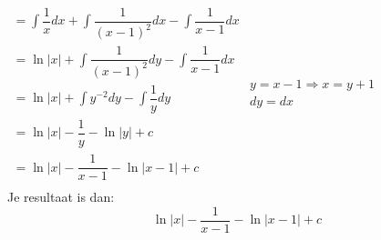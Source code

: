 \documentclass[a4paper]{article}
\newcommand{\integral}{\displaystyle\int}
\begin{document}
$\begin{array}{l}
    = \integral \dfrac{1}{x} dx + \integral \dfrac{1}{(x-1)^2} dx - \integral \dfrac{1}{x-1} dx \\
    = \ln|x| + \integral \dfrac{1}{(x-1)^2} dy - \integral \dfrac{1}{x-1} dx    \\
    = \ln|x| + \integral y^{-2} dy - \integral \dfrac{1}{y} dy    \\
    = \ln|x| - \dfrac{1}{y} - \ln|y| + c    \\
    = \ln|x| - \dfrac{1}{x-1} - \ln|x-1| + c    \\
\end{array}
\begin{array}{l}
    y = x - 1 \Rightarrow x = y + 1 \\
    dy = dx     \\
\end{array}$    \\

Je resultaat is dan:    \\

$$\ln|x| - \dfrac{1}{x-1} - \ln|x-1| + c$$
\end{document}
